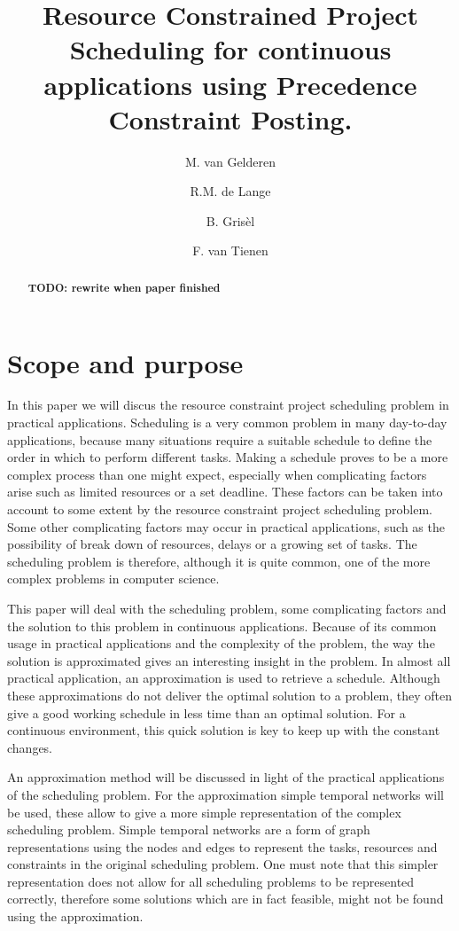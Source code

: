 \documentclass{article}
\title{Resource Constrained Project Scheduling for continuous applications using Precedence Constraint Posting.}
\author{M. van Gelderen  \and
    R.M. de Lange \and
    B. Gris\`el \and
    F. van Tienen}
\date{}
\theoremstyle{definition}
\newcommand{\TODO}[1]{{\color{red}\textbf{TODO: #1}}}
\begin{document}
\maketitle
\thispagestyle{empty}

\begin{abstract}
\TODO{rewrite when paper finished}
\end{abstract}


\newpage


\section{Scope and purpose}

In this paper we will discus the resource constraint project scheduling problem in practical applications.
Scheduling is a very common problem in many day-to-day applications, because many situations require a suitable schedule to define the order in which to perform different tasks.
Making a schedule proves to be a more complex process than one might expect, especially when complicating factors arise such as limited resources or a set deadline.
These factors can be taken into account to some extent by the resource constraint project scheduling problem.
Some other complicating factors may occur in practical applications, such as the possibility of break down of resources, delays or a growing set of tasks.
The scheduling problem is therefore, although it is quite common, one of the more complex problems in computer science.

This paper will deal with the scheduling problem, some complicating factors and the solution to this problem in continuous applications.
Because of its common usage in practical applications and the complexity of the problem, the way the solution is approximated gives an interesting insight in the problem.
In almost all practical application, an approximation is used to retrieve a schedule.
Although these approximations do not deliver the optimal solution to a problem, they often give a good working schedule in less time than an optimal solution.
For a continuous environment, this quick solution is key to keep up with the constant changes.

An approximation method will be discussed in light of the practical applications of the scheduling problem.
For the approximation simple temporal networks will be used, these allow to give a more simple representation of the complex scheduling problem.
Simple temporal networks are a form of graph representations using the nodes and edges to represent the tasks, resources and constraints in the original scheduling problem.
One must note that this simpler representation does not allow for all scheduling problems to be represented correctly, therefore some solutions which are in fact feasible, might not be found using the approximation.
\end{document}

